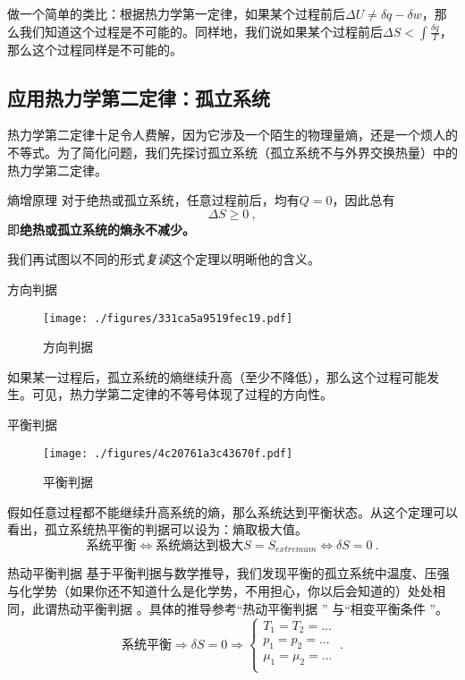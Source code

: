 做一个简单的类比：根据热力学第一定律，如果某个过程前后$\Delta U \ne \delta q - \delta w$，那么我们知道这个过程是不可能的。同样地，我们说如果某个过程前后$\Delta S < \int \frac{\delta q}{T}$，那么这个过程同样是不可能的。

\subsection{应用热力学第二定律：孤立系统}
热力学第二定律十足令人费解，因为它涉及一个陌生的物理量熵，还是一个烦人的不等式。为了简化问题，我们先探讨孤立系统（孤立系统不与外界交换热量）中的热力学第二定律。
\begin{corollary}{熵增原理}
对于绝热或孤立系统，任意过程前后，均有$Q=0$，因此总有 $$\Delta S \ge 0~,$$
即\textbf{绝热或孤立系统的熵永不减少。}
\end{corollary}
我们再试图以不同的形式\textsl{复读}这个定理以明晰他的含义。

\begin{corollary}{方向判据}
\begin{figure}[ht]
\centering
\texttt{[image: ./figures/331ca5a9519fec19.pdf]}
\caption{方向判据} \label{fig_Td2Law_1}
\end{figure}
如果某一过程后，孤立系统的熵继续升高（至少不降低），那么这个过程可能发生。可见，热力学第二定律的不等号体现了过程的方向性。
\end{corollary}

\begin{corollary}{平衡判据}
\begin{figure}[ht]
\centering
\texttt{[image: ./figures/4c20761a3c43670f.pdf]}
\caption{平衡判据} \label{fig_Td2Law_2}
\end{figure}
假如任意过程都不能继续升高系统的熵，那么系统达到平衡状态。从这个定理可以看出，孤立系统热平衡的判据可以设为：熵取极大值。
$$\text{系统平衡} \Leftrightarrow \text{系统熵达到极大} S=S_{extremum} \Leftrightarrow \delta S = 0~.$$
\end{corollary}

\begin{theorem}{热动平衡判据}
基于平衡判据与数学推导，我们发现平衡的孤立系统中温度、压强与化学势（如果你还不知道什么是化学势，不用担心，你以后会知道的）处处相同，此谓热动平衡判据  。具体的推导参考“热动平衡判据  ” 与“相变平衡条件  ”。
$$
\text{系统平衡} \Rightarrow \delta S = 0 \Rightarrow 
\left \{
\begin{aligned}
T_1 = T_2 = ...\\
p_1 = p_2 = ...\\
\mu_1 = \mu_2 = ...\\
\end{aligned}
\right.
~.
$$

\end{theorem}

